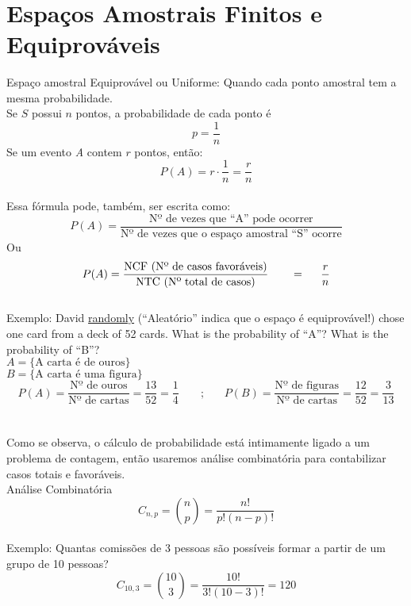 \documentclass{article}
\begin{document}
\\

\newpage
\section{Espaços Amostrais Finitos e Equiprováveis}
Espaço amostral Equiprovável ou Uniforme: Quando cada ponto amostral tem a mesma probabilidade.\\
Se $S$ possui $n$ pontos, a probabilidade de cada ponto é \\
\[\displaystyle p=\frac{1}{n}\]
Se um evento \textit{A} contem $r$ pontos, então:
\[P(A)=r\cdot\frac{1}{n}=\boxed{\frac{r}{n}}\]\\
\indent Essa fórmula pode, também, ser escrita como:\\
\[P(A)=\frac{\text{Nº de vezes que ``A'' pode ocorrer}}{\text{Nº de vezes que o espaço amostral ``S'' ocorre}}\]
\indent Ou
\[P(A)=\frac{\text{NCF (Nº de casos favoráveis)}}{\text{NTC (Nº total de casos)}}\hspace{.7cm}=\;\;\;\;\;\frac{r}{n}\]\\

\noindent Exemplo: David \underline{randomly} (``Aleatório'' indica que o espaço é equiprovável!) chose one card from a deck of 52 cards. What is the probability of ``A''? What is the probability of ``B''?\\
$A=\{\text{A carta é de ouros}\}$\\
$B=\{\text{A carta é uma figura}\}$\\
\[P(A)= \frac{\text{Nº de ouros}}{\text{Nº de cartas}}=\frac{13}{52}=\frac{1}{4} \;\;\;\;\;\;\;;\;\;\;\;\;\; P(B)=\frac{\text{Nº de figuras}}{\text{Nº de cartas}}=\frac{12}{52}=\frac{3}{13}\]\\
\\Como se observa, o cálculo de probabilidade está intimamente ligado a um problema de contagem, então usaremos análise combinatória para contabilizar casos totais e favoráveis.\\

{\large Análise Combinatória}\\
\[C_{n,p}=\binom{n}{p}=\frac{n!}{p!(n-p)!}\]\\
\indent Exemplo: Quantas comissões de 3 pessoas são possíveis formar a partir de um grupo de 10 pessoas?\\
\[C_{10,3}=\binom{10}{3}=\frac{10!}{3!(10-3)!}=120\]\\
\end{document}

